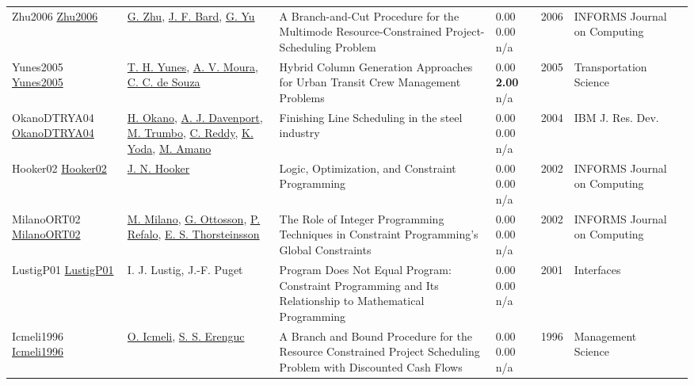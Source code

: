 {\begin{longtable}{p{3cm}p{5cm}p{10cm}p{1cm}rp{2.5cm}l}
Zhu2006 \href{http://dx.doi.org/10.1287/ijoc.1040.0121}{Zhu2006} & \hyperref[auth:a1526]{G. Zhu}, \hyperref[auth:a1527]{J. F. Bard}, \hyperref[auth:a1528]{G. Yu} & A Branch-and-Cut Procedure for the Multimode Resource-Constrained Project-Scheduling Problem & \noindent{}\textcolor{black!50}{0.00} \textcolor{black!50}{0.00} n/a & 2006 & \cellcolor{red!20}INFORMS Journal on Computing & \cite{Zhu2006}\\
Yunes2005 \href{http://dx.doi.org/10.1287/trsc.1030.0078}{Yunes2005} & \hyperref[auth:a941]{T. H. Yunes}, \hyperref[auth:a1578]{A. V. Moura}, \hyperref[auth:a170]{C. C. de Souza} & Hybrid Column Generation Approaches for Urban Transit Crew Management Problems & \noindent{}\textcolor{black!50}{0.00} \textbf{2.00} n/a & 2005 & \cellcolor{red!20}Transportation Science & \cite{Yunes2005}\\
OkanoDTRYA04 \href{https://doi.org/10.1147/rd.485.0811}{OkanoDTRYA04} & \hyperref[auth:a1287]{H. Okano}, \hyperref[auth:a248]{A. J. Davenport}, \hyperref[auth:a1288]{M. Trumbo}, \hyperref[auth:a250]{C. Reddy}, \hyperref[auth:a1289]{K. Yoda}, \hyperref[auth:a1290]{M. Amano} & Finishing Line Scheduling in the steel industry & \noindent{}\textcolor{black!50}{0.00} \textcolor{black!50}{0.00} n/a & 2004 & {IBM} J. Res. Dev. & \cite{OkanoDTRYA04}\\
Hooker02 \href{http://dx.doi.org/10.1287/ijoc.14.4.295.2828}{Hooker02} & \hyperref[auth:a160]{J. N. Hooker} & Logic, Optimization, and Constraint Programming & \noindent{}\textcolor{black!50}{0.00} \textcolor{black!50}{0.00} n/a & 2002 & \cellcolor{red!20}INFORMS Journal on Computing & \cite{Hooker02}\\
MilanoORT02 \href{http://dx.doi.org/10.1287/ijoc.14.4.387.2830}{MilanoORT02} & \hyperref[auth:a143]{M. Milano}, \hyperref[auth:a851]{G. Ottosson}, \hyperref[auth:a254]{P. Refalo}, \hyperref[auth:a873]{E. S. Thorsteinsson} & The Role of Integer Programming Techniques in Constraint Programming's Global Constraints & \noindent{}\textcolor{black!50}{0.00} \textcolor{black!50}{0.00} n/a & 2002 & \cellcolor{red!20}INFORMS Journal on Computing & \cite{MilanoORT02}\\
LustigP01 \href{http://dx.doi.org/10.1287/inte.31.6.29.9647}{LustigP01} & I. J. Lustig, J.-F. Puget & Program Does Not Equal Program: Constraint Programming and Its Relationship to Mathematical Programming & \noindent{}\textcolor{black!50}{0.00} \textcolor{black!50}{0.00} n/a & 2001 & \cellcolor{red!20}Interfaces & \cite{LustigP01}\\
Icmeli1996 \href{http://dx.doi.org/10.1287/mnsc.42.10.1395}{Icmeli1996} & \hyperref[auth:a1551]{O. Icmeli}, \hyperref[auth:a1552]{S. S. Erenguc} & A Branch and Bound Procedure for the Resource Constrained Project Scheduling Problem with Discounted Cash Flows & \noindent{}\textcolor{black!50}{0.00} \textcolor{black!50}{0.00} n/a & 1996 & Management Science & \cite{Icmeli1996}\\

\end{longtable}}

